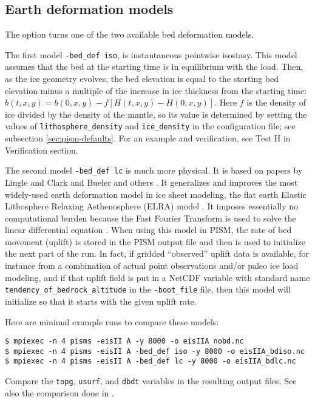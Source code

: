 \subsection{Earth deformation models} \label{subsect:beddef}  

The option  turns one of the two available bed deformation models.

The first model \texttt{-bed_def iso}, is instantaneous pointwise isostasy.  This model assumes that the bed at the starting time is in equilibrium with the load.  Then, as the ice geometry evolves, the bed elevation is equal to the starting bed elevation minus a multiple of the increase in ice thickness from the starting time: $b(t,x,y) = b(0,x,y) - f [H(t,x,y) - H(0,x,y)]$.  Here $f$ is the density of ice divided by the density of the mantle, so its value is determined by setting the values of \texttt{lithosphere_density} and \texttt{ice_density} in the configuration file; see subsection \ref{sec:pism-defaults}.  For an example and verification, see Test H in Verification section. 

The second model \texttt{-bed_def lc} is much more physical.  It is based on papers by Lingle and Clark \cite{LingleClark} and Bueler and others \cite{BLKfastearth}.  It generalizes and improves the most widely-used earth deformation model in ice sheet modeling, the flat earth Elastic Lithosphere Relaxing Asthenosphere (ELRA) model \cite{Greve2001}.  It imposes  essentially no computational burden because the Fast Fourier Transform is used to solve the linear differential equation \cite{BLKfastearth}.  When using this model in PISM, the rate of bed movement (uplift) is stored in the PISM output file and then is used to initialize the next part of the run.  In fact, if gridded ``observed'' uplift data is available, for instance from a combination of actual point observations and/or paleo ice load modeling, and if that uplift field is put in a NetCDF variable with standard name \texttt{tendency_of_bedrock_altitude} in the  \texttt{-boot_file} file, then this model will initialize so that it starts with the given uplift rate.

Here are minimal example runs to compare these models:
\begin{verbatim}
$ mpiexec -n 4 pisms -eisII A -y 8000 -o eisIIA_nobd.nc
$ mpiexec -n 4 pisms -eisII A -bed_def iso -y 8000 -o eisIIA_bdiso.nc
$ mpiexec -n 4 pisms -eisII A -bed_def lc -y 8000 -o eisIIA_bdlc.nc
\end{verbatim}
Compare the \texttt{topg}, \texttt{usurf}, and \texttt{dbdt} variables in the resulting output files.  See also the comparison done in \cite{BLKfastearth}.


